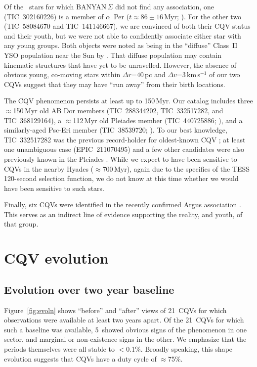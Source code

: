 \documentclass[11pt,twocolumn,tighten]{aastex63}
\newcommand{\ntwoyear}{21} %
\newcommand{\ntwoyearturnedoff}{5} %
\begin{document}
Of the \ngoodsfieldbanyan\ stars for which BANYAN\,$\Sigma$ did not
find any association, one (TIC~302160226) is a member of $\alpha$~Per
($t\approx 86\pm16$\,Myr;
\citealt{2021A&A...645A..84M,2022arXiv221109822B}).  For the other two
(TIC~58084670 and TIC~141146667), we are convinced of both their CQV
status and their youth, but we were not able to confidently associate
either star with any young groups.  Both objects were noted as being in the
``diffuse'' Class~II YSO population near the Sun by \citet{2021ApJ...917...23K}.
That diffuse population may contain kinematic structures that have yet
to be unravelled.  However, the absence of obvious young, co-moving
stars within $\Delta r$=$40$\,pc and $\Delta v$=$3$\,km\,s$^{-1}$ of
our two CQVs suggest that they may have ``run away'' from their birth
locations.

The CQV phenomenon persists at least up to 150\,Myr.  Our catalog
includes three $\approx$150\,Myr old AB Dor members (TIC~288344202,
TIC~332517282, and TIC~368129164), a $\approx$112\,Myr old Pleiades
member (TIC~440725886; \citealt{CantatGaudin_2020}), and a
similarly-aged Psc-Eri member (TIC~38539720;
\citealt{2020A&A...639A..64R}).  To our best knowledge, TIC~332517282
was the previous record-holder for oldest-known CQV
\citep{2019ApJ...876..127Z,2022AJ....163..144G}; at least one
unambiguous case (EPIC~211070495) and a few other candidates were also
previously known in the Pleiades \citep{2016AJ....152..114R}.  While
we expect to have been sensitive to CQVs in the nearby Hyades
($\approx$700\,Myr), again due to the specifics of the TESS 120-second
selection function, we do not know at this time whether we would have
been sensitive to such stars.

Finally, six CQVs were identified in the recently confirmed Argus
association \citep{2019ApJ...870...27Z}.  This serves as an indirect
line of evidence supporting the reality, and youth, of that group.


\section{CQV evolution}

\subsection{Evolution over two year baseline}

Figure~\ref{fig:evoln} shows ``before'' and ``after'' views
of \ntwoyear\ CQVs for which observations were available at least two years
apart.
Of the \ntwoyear\ CQVs for which such a baseline was available,
\ntwoyearturnedoff\ showed obvious signs of the phenomenon in one sector,
and marginal or non-existence signs in the other.
We emphasize that the periods themselves were all stable to $<$0.1\%.
Broadly speaking, this shape evolution
suggests that CQVs have a duty cycle of $\approx$75\%.
\end{document}

